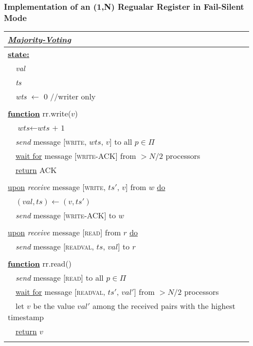 \documentclass{article}
\begin{document}
\begin{adjustwidth}{2em}{2em}
\begin{adjustwidth}{2em}{2em}
			\subsubsection{Implementation of an (1,N) Regualar Register in Fail-Silent Mode}
			\begin{center}
				\begin{tabular}{|l|}
					\hline
					\cellcolor{gray!80} \underline{\textbf{\textit{Majority-Voting}}} \\
					\hline
					\underline{\textbf{state:}} \\
					\ \ \textit{val} \\
					\ \ \textit{ts} \\
					\ \ \textit{wts} $\leftarrow$ 0 //writer only \\
					\\
					\underline{\textbf{function}} rr.write($v$) \\ 
					\ \ $\textit{wts} \leftarrow \textit{wts + 1}$ \\
					\ \ \textit{send} message [\textsc{write}, $wts$, $v$] to all $p \in \Pi$ \\
					\ \ \underline{wait for} message [\textsc{write-ACK}] from $>N/2$ processors \\
					\ \ \underline{return} \textsc{ACK} \\											\\
					\underline{upon} \textit{receive} message [\textsc{write}, $ts'$, $v$] from $w$ \underline{do} \\
					\ \ $(val, ts) \leftarrow (v, ts')$ \\
					\ \ \textit{send} message [\textsc{write-ACK}] to $w$ \\
					\\
					\underline{upon} \textit{receive} message [\textsc{read}] from $r$ \underline{do} \\
					\ \ \textit{send} message [\textsc{readval}, $ts$, $val$] to $r$ \\
					\\
					\underline{\textbf{function}} rr.read() \\
					\ \ \textit{send} message [\textsc{read}] to all $p \in \Pi$ \\
					\ \ \underline{wait for} message [\textsc{readval}, $ts'$, $val'$] from $>N/2$ processors \\
					\ \ let $v$ be the value $val'$ among the received pairs with the highest timestamp \\
					\ \ \underline{return} $v$\\
					\\
					\hline
				\end{tabular}
			\end{center}
		\end{adjustwidth}
	\end{adjustwidth}
	
\end{document}
